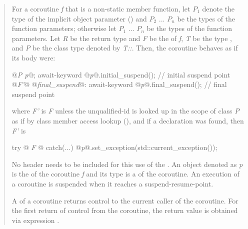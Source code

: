 \begin{quote}
\pnum
For a coroutine \textit{f} that is a non-static member function, let $P_1$ denote the type of the implicit object parameter () and $P_2$ ... $P_n$ be the types of the function parameters; otherwise let $P_1$ ... $P_n$ be the types of the function parameters.
Let \textit{R} be the return type and \textit{F} be the 
of \textit{f}, \textit{T} be the type , and \textit{P} be the class type denoted by \textit{T::}. 
Then, the coroutine behaves as if its body were:
\begin{codeblock}
  {
     @\textit{P p}@;
     await-keyword @\textit{p}@.initial_suspend(); // initial suspend point
     @\textit{F'}@
  @\textit{final_suspend}@:
     await-keyword @\textit{p}@.final_suspend(); // final suspend point
  }
\end{codeblock}
where 
\textit{F'} is \textit{F} unless the unqualified-id  is looked up in the scope of class \textit{P}
as if by class member access lookup (), and if a declaration was found, then \textit{F'} is

\begin{codeblock}
  try {@\textit{ F }@} catch(...) { @\textit{p}@.set_exception(std::current_exception()); }
\end{codeblock}

No header needs to be included for this use of the  .
An object denoted as \textit{p} is the  of
the coroutine \textit{f} and its type is a 
of the coroutine.
An execution of a coroutine is suspended when it reaches a suspend-resume-point. 

\pnum 
A  of a coroutine returns control to the current
caller of the coroutine. For the first return of control from the coroutine, the return value is obtained via
expression .


\end{quote}
